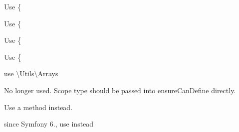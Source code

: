 \begin{DoxyRefList}
%
Use \{ 
\item[Global \doxylink{class_ramsey_1_1_uuid_1_1_uuid_a16c5a6b8bb8801b587740a185dcb697d}{Uuid\+::UUID\+\_\+\+TYPE\+\_\+\+PEABODY} ]\label{deprecated__deprecated000320}%
%
Use \{ 
\item[Global \doxylink{class_ramsey_1_1_uuid_1_1_uuid_ab43a8de8f13c0abb8d7e66286924f4b2}{Uuid\+::VALID\+\_\+\+PATTERN} ]\label{deprecated__deprecated000318}%
%
Use \{ 
\item[Class \doxylink{class_ramsey_1_1_uuid_1_1_nonstandard_1_1_uuid_v6}{Uuid\+V6} ]\label{deprecated__deprecated000316}%
%
Use \{ 
\item[Global \doxylink{class_nette_1_1_utils_1_1_validators_aceb16cfda511c925d76ccbfc036aad12}{Validators\+::is\+List} (mixed \$value)]\label{deprecated__deprecated000169}%
%
use \textbackslash{}\+Utils\textbackslash{}\+Arrays  
\item[Global \doxylink{class_psy_1_1_code_cleaner_1_1_valid_class_name_pass_a4f336c8e2af00f546e13ca6b2d1340ca}{Valid\+Class\+Name\+Pass\+::get\+Scope\+Type} (Stmt \$stmt)]\label{deprecated__deprecated000245}%
%
No longer used. Scope type should be passed into ensure\+Can\+Define directly. 
\item[Global \doxylink{class_faker_1_1_valid_generator_a58ffd33948550ba0c0ce764acbce71ac}{Valid\+Generator\+::\+\_\+\+\_\+get} (\$attribute)]\label{deprecated__deprecated000028}%
%
Use a method instead.  
\item[Global \doxylink{class_symfony_1_1_component_1_1_http_kernel_1_1_controller_1_1_argument_resolver_1_1_variadic_value_resolver_a6ec650d93faf4a03256428253dd7e013}{Variadic\+Value\+Resolver\+::supports} (Request \$request, Argument\+Metadata \$argument)]\label{deprecated__deprecated000343}%
%
since Symfony 6., use  instead  
\item[Global \doxylink{class_illuminate_1_1_foundation_1_1_vite_a4dd48a01ddb0b3cfd97b75f1c7602804}{Vite\+::make\+Script\+Tag} (\$url)]\label{deprecated__deprecated000067}%

\end{DoxyRefList}

